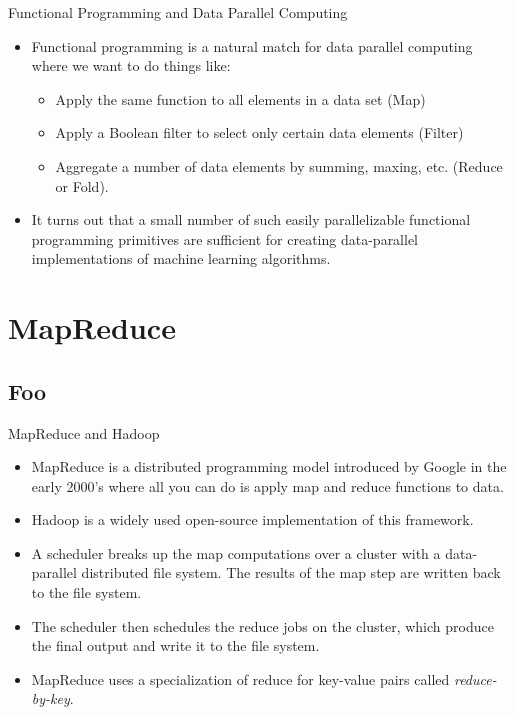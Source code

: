 \documentclass[serif,xcolor=pdftex,dvipsnames,table,hyperref={bookmarks=false,breaklinks}]{beamer}
\begin{document}
\begin{frame}[t]{Functional Programming and Data Parallel Computing}
\begin{itemize}
\item Functional programming is a natural match for data parallel computing
where we want to do things like:

\begin{itemize}
\pause \item Apply the same function to all elements in a 
data set (Map) 
\pause \item Apply a Boolean filter to select only certain data elements 
(Filter)
\pause \item Aggregate a number of data elements by summing, maxing, etc. 
(Reduce or Fold).
\end{itemize}

\pause \item It turns out that a small number of such easily parallelizable 
functional programming primitives are sufficient for creating data-parallel
implementations of machine learning algorithms. 

\end{itemize}
\end{frame}

\section{MapReduce}
\subsection{Foo}

\begin{frame}[t]{MapReduce and Hadoop}
\begin{itemize}

\item MapReduce is a distributed programming model 
introduced by Google in the early 2000's where all you can do is apply map and 
reduce functions to data. 

\pause\item Hadoop is a widely used open-source implementation of this 
framework.

\pause\item A scheduler breaks up the map 
computations over a cluster with a data-parallel distributed file system. The 
results of the map step are written back to the file system.

\pause\item The scheduler then schedules the reduce jobs on the cluster, which 
produce the final output and write it to the file system. 

\pause\item MapReduce uses a 
specialization of reduce for key-value pairs called \textit{reduce-by-key}.

\end{itemize}
\end{frame}
\end{document}
